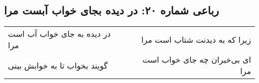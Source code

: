 \begin{center}
\section*{رباعی شماره ۲۰: در دیده بجای خواب آبست مرا}
\label{sec:sh020}
\begin{longtable}{l p{0.5cm} r}
در دیده به جای خواب آب است مرا
&&
زیرا که به دیدنت شتاب است مرا
\\
گویند بخواب تا به خوابش بینی
&&
ای بی‌خبران چه جای خواب است مرا
\\
\end{longtable}
\end{center}
